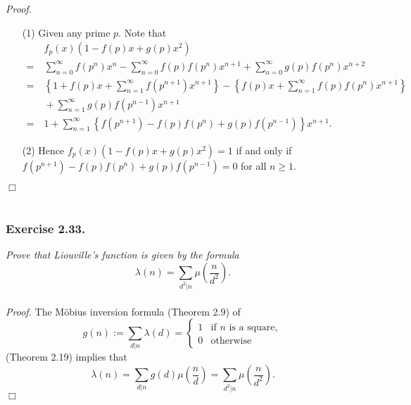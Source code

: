 \documentclass{article}
\begin{document}
\emph{Proof.}
\begin{enumerate}
\item[(1)]
  Given any prime $p$.
  Note that
  \begin{align*}
    & \:
    f_p(x)(1 - f(p)x + g(p)x^2) \\
    = & \:
    \sum_{n=0}^{\infty} f(p^n)x^n
        - \sum_{n=0}^{\infty} f(p)f(p^n)x^{n+1}
        + \sum_{n=0}^{\infty} g(p)f(p^n)x^{n+2} \\
    = & \:
    \left\{ 1 + f(p)x + \sum_{n=1}^{\infty} f(p^{n+1})x^{n+1} \right\}
        - \left\{ f(p)x + \sum_{n=1}^{\infty} f(p)f(p^n)x^{n+1} \right\} \\
    & \:
        + \sum_{n=1}^{\infty} g(p)f(p^{n-1})x^{n+1} \\
    = & \:
    1 + \sum_{n=1}^{\infty}\left\{ f(p^{n+1}) - f(p)f(p^n) + g(p)f(p^{n-1}) \right\} x^{n+1}.
  \end{align*}

\item[(2)]
  Hence
  $f_p(x)(1 - f(p)x + g(p)x^2) = 1$
  if and only if $f(p^{n+1}) - f(p)f(p^n) + g(p)f(p^{n-1}) = 0$ for all $n \geq 1$.
\end{enumerate}
$\Box$ \\\\












\subsubsection*{Exercise 2.33.}
\emph{Prove that Liouville's function is given by the formula}
\[
  \lambda(n) = \sum_{d^2|n} \mu\left( \frac{n}{d^2} \right).
\] \\



\emph{Proof.}
  The M\"obius inversion formula (Theorem 2.9) of
  \begin{equation*}
    g(n) := \sum_{d|n} \lambda(d) =
    \begin{cases}
      1 & \text{if $n$ is a square}, \\
      0 & \text{otherwise}
    \end{cases}
  \end{equation*}
  (Theorem 2.19) implies that
  \[
    \lambda(n)
    = \sum_{d|n} g(d) \mu\left( \frac{n}{d} \right)
    = \sum_{d^2|n} \mu\left( \frac{n}{d^2} \right).
  \]
$\Box$ \\\\
\end{document}
